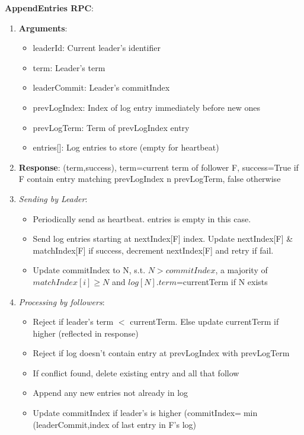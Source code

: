 \documentclass[8pt, landscape]{extarticle}
\begin{document}
\begin{multicols*}{4}
\textbf{AppendEntries RPC}:
\begin{enumerate}
    \item \textbf{Arguments}:
    \begin{itemize}
        \item leaderId: Current leader's identifier
        \item term: Leader's term
        \item leaderCommit: Leader's commitIndex
        \item prevLogIndex: Index of log entry immediately before new ones
        \item prevLogTerm: Term of prevLogIndex entry
        \item entries[]: Log entries to store (empty for heartbeat)
    \end{itemize}
    \item \textbf{Response}: (term,success), term=current term of follower F, success=True if F contain entry matching prevLogIndex n prevLogTerm, false otherwise 
    \item \textit{Sending by Leader}:
    \begin{itemize}
        \item Periodically send as heartbeat. entries is empty in this case.
        \item Send log entries starting at nextIndex[F] index. Update nextIndex[F] \& matchIndex[F] if success, decrement nextIndex[F] and retry if fail.
        \item Update commitIndex to N, s.t. $N > commitIndex$, a majority of $matchIndex[i]\geq N$ and $log[N].term$=currentTerm if N exists
    \end{itemize}
    \item \textit{Processing by followers}:
    \begin{itemize}
        \item Reject if leader's term $<$ currentTerm. Else update currentTerm if higher (reflected in response)
        \item Reject if log doesn't contain entry at prevLogIndex with prevLogTerm
        \item If conflict found, delete existing entry and all that follow
        \item Append any new entries not already in log
        \item Update commitIndex if leader's is higher (commitIndex=$\min$(leaderCommit,index of last entry in F's log)
    \end{itemize}
\end{enumerate}


\end{multicols*}
\end{document}

